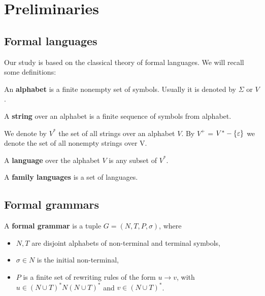\chapter{Preliminaries} %
\label{cha:preliminaries}

\section{Formal languages} %
\label{sec:formal_languages}

Our study is based on the classical theory of formal languages. We will recall some definitions:

\begin{definition}
An {\bf alphabet} is a finite nonempty set of symbols. Usually it is denoted by $\Sigma$ or $V$.
\end{definition}

\begin{definition}
A {\bf string} over an alphabet is a finite sequence of symbols from alphabet.
\end{definition}

We denote by $V^*$ the set of all strings over an alphabet $V$. By $V^+$ = $V^* - \{\varepsilon\}$ we denote the set of all nonempty strings over V.

\begin{definition}
A {\bf language} over the alphabet $V$ is any subset of $V^*$.
\end{definition}

\begin{definition}
A {\bf family languages} is a set of languages.
\end{definition}


\section{Formal grammars} %
\label{sec:formal_grammars}

\begin{definition}
A {\bf formal grammar} is a tuple $G = (N,T,P,\sigma)$, where
\begin{itemize}
  \item $N, T$ are disjoint alphabets of non-terminal and terminal symbols,
  \item $\sigma\in N$ is the initial non-terminal,
  \item $P$ is a finite set of rewriting rules of the form $u\rightarrow v$, with $u\in (N\cup T)^*N(N\cup T)^*$ and $v\in (N\cup T)^*$.
\end{itemize}
\end{definition}

